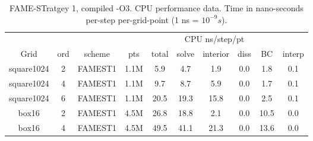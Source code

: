 {
\begin{table}[hbt] \small
\centering
\begin{tabular}{|c|c|c|c|c|c|c|c|c|c|} \hline
            &        &       & \multicolumn{7}{c|}{CPU ns/step/pt}  \\ 
   Grid         & ord & scheme & pts   & total   &  solve  &  interior  & diss  &   BC  & interp \\  \hline
  square1024 & 2 & FAMEST1  & 1.1M  &     5.9 &     4.7 &     1.9 &     0.0 &     1.8 &     0.1   \\
  square1024 & 4 & FAMEST1  & 1.1M  &     9.7 &     8.7 &     5.9 &     0.0 &     1.7 &     0.1   \\
  square1024 & 6 & FAMEST1  & 1.1M  &    20.5 &    19.3 &    15.8 &     0.0 &     2.5 &     0.1   \\
  \hline
  box16 & 2 & FAMEST1  & 4.5M  &    26.8 &    18.8 &     2.1 &     0.0 &    10.5 &     0.0   \\
  box16 & 4 & FAMEST1  & 4.5M  &    49.5 &    41.1 &    21.3 &     0.0 &    13.6 &     0.0   \\
\hline  
\end{tabular}
\caption{FAME-STratgey 1, compiled -O3. CPU performance data. 
Time in nano-seconds per-step per-grid-point (1 ns = $10^{-9}s$).
}
\label{tab:cpuPerformanceFAMEV1}    
\end{table}
}

